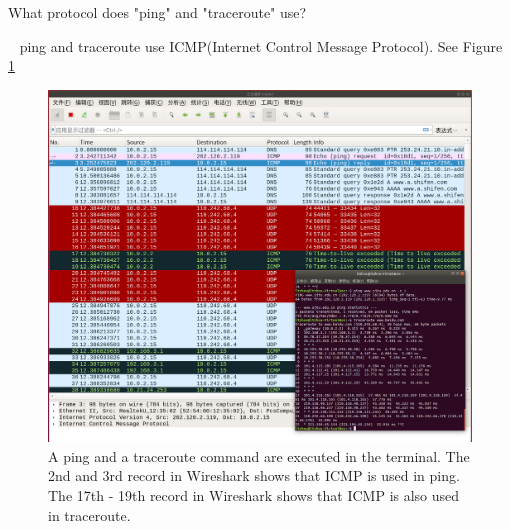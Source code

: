 \begin{exercise}[]{What protocol does "ping" and "traceroute" use?}
  \begin{solution}
  \par{~}
  ping and traceroute use ICMP(Internet Control Message Protocol). See Figure \ref{fig1}

\begin{figure}[hb]
    \begin{center}
        \includegraphics[width=12cm]{img/lab1/ex1}
        \caption{A ping and a traceroute command are executed in the terminal. The 2nd and 3rd record in Wireshark shows that ICMP is used in ping. The 17th - 19th record in Wireshark shows that ICMP is also used in traceroute.}
        \label{fig1}
    \end{center}
\end{figure}
  
  \end{solution}
  \label{ex1}
\end{exercise}


